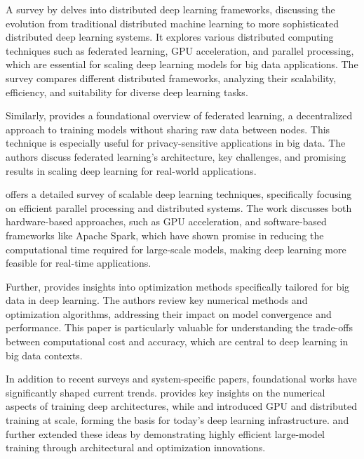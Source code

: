 \documentclass[acmsmall]{acmart}
\begin{document}
A survey by \citet{zhang2023distributed} delves into distributed deep learning frameworks, discussing the evolution from traditional distributed machine learning to more sophisticated distributed deep learning systems. It explores various distributed computing techniques such as federated learning, GPU acceleration, and parallel processing, which are essential for scaling deep learning models for big data applications. The survey compares different distributed frameworks, analyzing their scalability, efficiency, and suitability for diverse deep learning tasks.

Similarly, \citet{li2019federated} provides a foundational overview of federated learning, a decentralized approach to training models without sharing raw data between nodes. This technique is especially useful for privacy-sensitive applications in big data. The authors discuss federated learning's architecture, key challenges, and promising results in scaling deep learning for real-world applications.

\citet{li2020survey} offers a detailed survey of scalable deep learning techniques, specifically focusing on efficient parallel processing and distributed systems. The work discusses both hardware-based approaches, such as GPU acceleration, and software-based frameworks like Apache Spark, which have shown promise in reducing the computational time required for large-scale models, making deep learning more feasible for real-time applications.

Further, \citet{ben2019demystifying} provides insights into optimization methods specifically tailored for big data in deep learning. The authors review key numerical methods and optimization algorithms, addressing their impact on model convergence and performance. This paper is particularly valuable for understanding the trade-offs between computational cost and accuracy, which are central to deep learning in big data contexts.

In addition to recent surveys and system-specific papers, foundational works have significantly shaped current trends.
\citet{bengio2012practical} provides key insights on the numerical aspects of training deep architectures, while \citet{krizhevsky2012imagenet}
and \citet{dean2012large} introduced GPU and distributed training at scale, forming the basis for today's deep learning infrastructure.
\citet{shazeer2017outrageously} and \citet{you2019large} further extended these ideas by demonstrating highly efficient large-model training
through architectural and optimization innovations.
\end{document}
